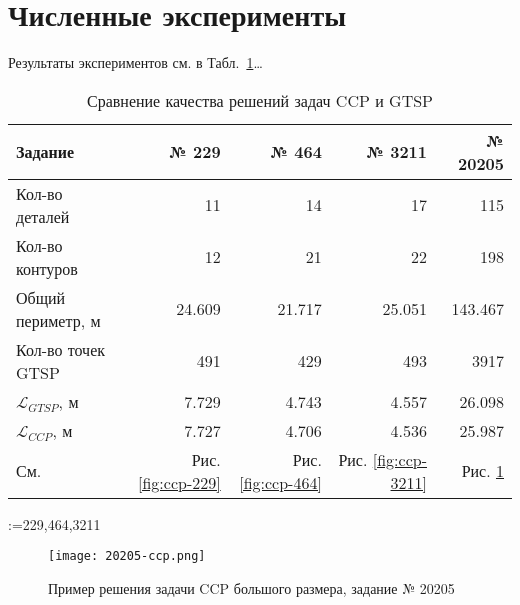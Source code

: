 
\section{Численные эксперименты}
\label{sec:ccp.exp}

Результаты экспериментов см. в Табл.~\ref{tab:ccp-vs-gtsp}\dots

\begin{table}[b]
  \centering
  \caption{Сравнение качества решений задач CCP и GTSP}
  \label{tab:ccp-vs-gtsp}
  \def\arraystretch{1.2}
  \begin{tabular}{l|*{4}{r}}
      Задание & № 229 & № 464 & № 3211 & № 20205 \\
      \hline
      Кол-во деталей & 11 & 14 & 17 & 115 \\
      Кол-во контуров & 12 & 21 & 22 & 198 \\
      Общий периметр, м & 24.609 & 21.717 & 25.051 & 143.467 \\
      Кол-во точек GTSP & 491 & 429 & 493 & 3917 \\
      $\mathcal L_{GTSP}$, м & 7.729 & 4.743 & 4.557 & 26.098 \\
      $\mathcal L_{CCP}$, м & 7.727 & 4.706 & 4.536  & 25.987 \\
      См. & Рис. \ref{fig:ccp-229} & Рис. \ref{fig:ccp-464} & Рис. \ref{fig:ccp-3211} & Рис. \ref{fig:ccp-20205} \\
      \hline
  \end{tabular}
\end{table}

\makeatletter
  \@for\job:={229,464,3211}
\makeatother

\begin{figure}
  \centering
  \texttt{[image: 20205-ccp.png]}
  \caption{Пример решения задачи CCP большого размера, задание № 20205}
  \label{fig:ccp-20205}
\end{figure}
